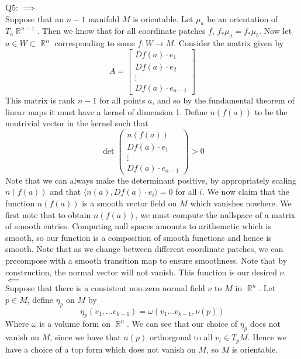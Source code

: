 \documentclass[letterpaper]{article}
\DeclareMathOperator{\R}{\mathbb{R}}
\newcommand{\lan}{\langle}
\newcommand{\ran}{\rangle}
\newcommand{\inn}[1]{\lan#1\ran}
\begin{document}
\noindent Q5: $\implies$
\newline \\ Suppose that an $n-1$ manifold $M$ is orientable. Let $\mu_a$ be an orientation of $T_a\R^{n-1}$. Then we know that for all coordinate patches $f$, $f_\ast \mu_a = f_\ast \mu_b$. Now let $a\in W \subset \R^n$ corresponding to some $f:W\to M$. Consider the matrix given by $$A = \begin{bmatrix} Df(a)\cdot e_1 \\ Df(a)\cdot e_2 \\ \vdots \\ Df(a)\cdot e_{n-1} \end{bmatrix}$$
This matrix is rank $n-1$ for all points $a$, and so by the fundamental theorem of linear maps it must have a kernel of dimension 1.  Define $n(f(a))$ to be the nontrivial vector in the kernel such that $$\det \begin{pmatrix} n(f(a)) \\ Df(a)\cdot e_1 \\ \vdots \\ Df(a)\cdot e_{n-1} \end{pmatrix}>0$$ Note that we can always make the determinant positive, by appropriately scaling $n(f(a))$ and that $\inn{n(a),Df(a)\cdot e_{i}}=0$ for all $i$. We now claim that the function $n(f(a))$ is a smooth vector field on $M$ which vanishes nowhere. We first note that to obtain $n(f(a))$, we must compute the nullspace of a matrix of smooth entries. Computing null spaces amounts to arithemetic which is smooth, so our function is a composition of smooth functions and hence is smooth. Note that as we change between different coordinate patches, we can precompose with a smooth transition map to ensure smoothness. Note that by construction, the normal vector will not vanish. This function is our desired $\nu$. 
\newline \\ $\impliedby$
\newline \\ Suppose that there is a consistent non-zero normal field $\nu$ to $M$ in $\R^n$. Let $p\in M$, define $\eta_p$ on $M$ by $$\eta_p (v_1, \dots v_{k-1}) = \omega(v_1 \dots v_{k-1}, \nu(p))$$ Where $\omega$ is a volume form on $\R^n$. We can see that our choice of $\eta_p$ does not vanish on $M$, since we have that $n(p)$ orthorgonal to all $v_i\in T_pM$. Hence we have a choice of a top form which does not vanish on $M$, so $M$ is orientable. 
\end{document}
